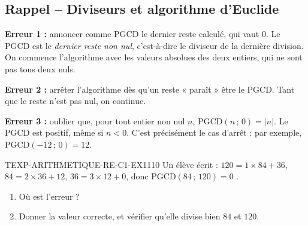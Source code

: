 

\subsection*{Rappel -- Diviseurs et algorithme d'Euclide}

\textbf{Erreur 1 :} annoncer comme PGCD le dernier reste calculé, qui vaut $0$.
Le PGCD est le \emph{dernier reste non nul}, c'est-à-dire le diviseur de la
dernière division. On commence l'algorithme avec les valeurs absolues des deux
entiers, qui ne sont pas tous deux nuls.

\textbf{Erreur 2 :} arrêter l'algorithme dès qu'un reste « paraît » être le
PGCD. Tant que le reste n'est pas nul, on continue.

\textbf{Erreur 3 :} oublier que, pour tout entier non nul $n$,
$\mathrm{PGCD}(n\,;\,0)=\lvert n\rvert$. Le PGCD est positif, même si $n<0$.
C'est précisément le cas d'arrêt : par exemple,
$\mathrm{PGCD}(-12\,;\,0)=12$.


\begin{exercice}{TEXP-ARITHMETIQUE-RE-C1-EX1}{1}{10}
Un élève écrit : \og $120=1\times84+36$, $84=2\times36+12$, $36=3\times12+0$,
donc $\mathrm{PGCD}(84\,;\,120)=0$ \fg.
\begin{enumerate}
  \item Où est l'erreur ?
  \item Donner la valeur correcte, et vérifier qu'elle divise bien $84$ et $120$.
\end{enumerate}
\end{exercice}
